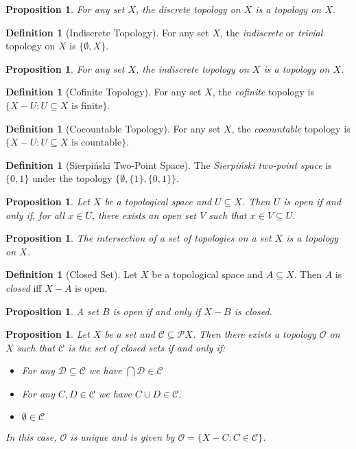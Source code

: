 \documentclass{book}
\newtheorem{prop}[ax]{Proposition}
\theoremstyle{definition}
\newtheorem{df}[ax]{Definition}
\begin{document}
\begin{prop}
For any set $X$, the discrete topology on $X$ is a topology on $X$.
\end{prop}

\begin{df}[Indiscrete Topology]
For any set $X$, the \emph{indiscrete} or \emph{trivial} topology on $X$ is  $\{ \emptyset, X \}$.
\end{df}

\begin{prop}
For any set $X$, the indiscrete topology on $X$ is a topology on $X$.
\end{prop}

\begin{df}[Cofinite Topology]
For any set $X$, the \emph{cofinite} topology is $\{ X - U : U \subseteq X \text{ is finite} \}$.
\end{df}

\begin{df}[Cocountable Topology]
For any set $X$, the \emph{cocountable} topology is $\{ X - U : U \subseteq X \text{ is countable} \}$.
\end{df}

\begin{df}[Sierpi\'{n}ski Two-Point Space]
The \emph{Sierpi\'{n}ski two-point space} is $\{0,1\}$ under the topology $\{ \emptyset, \{1\}, \{0,1\} \}$.
\end{df}

\begin{prop}
Let $X$ be a topological space and $U \subseteq X$. Then $U$ is open if and only if, for all $x \in U$, there exists an open set $V$ such that $x \in V \subseteq U$.
\end{prop}

\begin{prop}
The intersection of a set of topologies on a set $X$ is a topology on $X$.
\end{prop}

\begin{df}[Closed Set]
Let $X$ be a topological space and $A \subseteq X$. Then $A$ is \emph{closed} iff $X - A$ is open.
\end{df}

\begin{prop}
A set $B$ is open if and only if $X - B$ is closed.
\end{prop}

\begin{prop}
Let $X$ be a set and $\mathcal{C} \subseteq \mathcal{P} X$. Then there exists a topology $\mathcal{O}$ on $X$ such that $\mathcal{C}$ is the set of closed sets if and only if:
\begin{itemize}
\item For any $\mathcal{D} \subseteq \mathcal{C}$ we have $\bigcap \mathcal{D} \in \mathcal{C}$
\item For any $C, D \in \mathcal{C}$ we have $C \cup D \in \mathcal{C}$.
\item $\emptyset \in \mathcal{C}$
\end{itemize}
In this case, $\mathcal{O}$ is unique and is given by $\mathcal{O} = \{ X - C : C \in \mathcal{C} \}$.
\end{prop}
\end{document}
